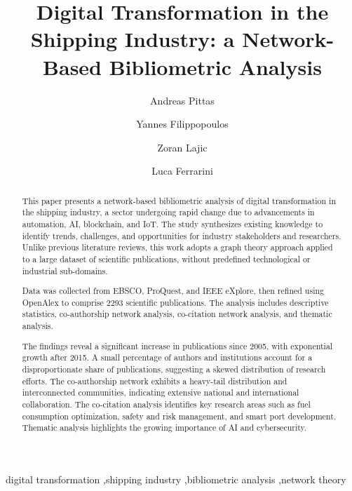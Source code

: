 \documentclass[a4paper, review, endfloat, doubleblind, authoryear]{elsarticle}
\title{Digital Transformation in the Shipping Industry: a Network-Based Bibliometric Analysis}
\author[1]{Andreas Pittas}
\author[1]{Yannes Filippopoulos}
\author[2]{Zoran Lajic}
\author[1]{Luca Ferrarini\corref{cor1}}
\affiliation[1]{organization={Department of Information Technologies, University of Limassol},
	city={Limassol},
	country={Cyprus}}
\affiliation[2]{organization={Department of Energy Efficiency, Angelicoussis Group},
	city={Athens},
	country={Greece}}
\begin{document}
	
	\begin{abstract}
		This paper presents a network-based bibliometric analysis of digital transformation in the shipping industry, a sector undergoing rapid change due to advancements in automation, AI, blockchain, and IoT. The study synthesizes existing knowledge to identify trends, challenges, and opportunities for industry stakeholders and researchers. Unlike previous literature reviews, this work adopts a graph theory approach applied to a large dataset of scientific publications, without predefined technological or industrial sub-domains.
		
		Data was collected from EBSCO, ProQuest, and IEEE eXplore, then refined using OpenAlex to comprise 2293 scientific publications. The analysis includes descriptive statistics, co-authorship network analysis, co-citation network analysis, and thematic analysis.
				
		The findings reveal a significant increase in publications since 2005, with exponential growth after 2015. A small percentage of authors and institutions account for a disproportionate share of publications, suggesting a skewed distribution of research efforts. The co-authorship network exhibits a heavy-tail distribution and interconnected communities, indicating extensive national and international collaboration. The co-citation analysis identifies key research areas such as fuel consumption optimization, safety and risk management, and smart port development. Thematic analysis highlights the growing importance of AI and cybersecurity.
	\end{abstract}
	
	\begin{keyword}
		digital transformation \sep shipping industry \sep bibliometric analysis \sep network theory
	\end{keyword}
	
	\maketitle  %
	
\end{document}
